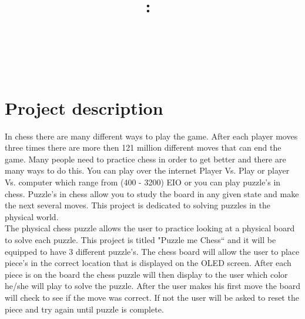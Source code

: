 \documentclass[11pt]{article}
\title{\vspace{2in}\textmd{\textbf{\hmwkClass:\ \hmwkTitle}}\\\normalsize\vspace{0.1in}\small{\hmwkDueDate}\\\vspace{0.1in}\large{\textit{\hmwkClassInstructor\ }}\vspace{3in}}
\date{}
\author{\textbf{\hmwkAuthorName}}
\begin{document}
\maketitle %
\newpage

\tableofcontents %


\clearpage 
\section{Project description}
In chess there are many different ways to play the game. After each player moves three times there are more then 121 million different moves that can end the game. Many people need to practice chess in order to get better and there are many ways to do this. You can play over the internet Player Vs. Play or player Vs. computer which range from (400 - 3200) EIO or you can play puzzle's in chess. Puzzle's in chess allow you to study the board in any given state and make the next several moves. This project is dedicated to solving puzzles in the physical world. 
\\

\noindent The physical chess puzzle allows the user to practice looking at a physical board to solve each puzzle. This project is titled "Puzzle me Chess`` and it will be equipped to have 3 different puzzle's. The chess board will allow the user to place piece's in the correct location that is displayed on the OLED screen. After each piece is on the board the chess puzzle will then display to the user which color he/she will play to solve the puzzle. After the user makes his first move the board will check to see if the move was correct. If not the user will be asked to reset the piece and try again until puzzle is complete. 
\end{document}
